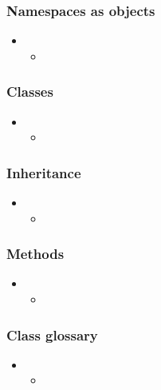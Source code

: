 \begin{frame}[fragile]
%
  \frametitle{Namespaces as objects}
%
  \begin{itemize}
%
  \item 
    \begin{itemize}
    \item
    \end{itemize}
%
  \end{itemize}
%
\end{frame}

\begin{frame}[fragile]
%
  \frametitle{Classes}
%
  \begin{itemize}
%
  \item 
    \begin{itemize}
    \item
    \end{itemize}
%
  \end{itemize}
%
\end{frame}

\begin{frame}[fragile]
%
  \frametitle{Inheritance}
%
  \begin{itemize}
%
  \item 
    \begin{itemize}
    \item
    \end{itemize}
%
  \end{itemize}
%
\end{frame}

\begin{frame}[fragile]
%
  \frametitle{Methods}
%
  \begin{itemize}
%
  \item 
    \begin{itemize}
    \item
    \end{itemize}
%
  \end{itemize}
%
\end{frame}

\begin{frame}[fragile]
%
  \frametitle{Class glossary}
%
  \begin{itemize}
%
  \item 
    \begin{itemize}
    \item
    \end{itemize}
%
  \end{itemize}
%
\end{frame}

